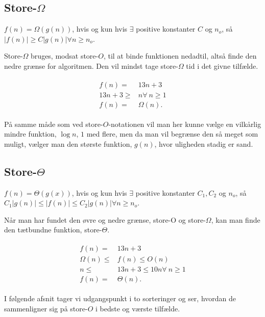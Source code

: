 \subsection{Store-$\Omega$}
\begin{defn}
$f(n) = \Omega(g(n))$, hvis og kun hvis $\exists$ positive konstanter $C$ og $n_o$, så $|f(n)| \geq C |g(n)| \forall n \geq n_o$.
\end{defn}
Store-$\Omega$ bruges, modsat store-$O$, til at binde funktionen nedadtil, altså finde den nedre grænse for algoritmen. Den vil mindst tage store-$\Omega$ tid i det givne tilfælde.
\begin{exmp}
\begin{align}
\begin{split}
f(n)=& 13n+3 \\
13n+3 \geq& n \forall \ n \geq 1 \\
f(n) =& \Omega(n).
\end{split}
\end{align}
\end{exmp}

På samme måde som ved store-$O$-notationen vil man her kunne vælge en vilkårlig mindre funktion, $\log n$, $1$ med flere, men da man vil begrænse den så meget som muligt, vælger man den største funktion, $g(n)$, hvor uligheden stadig er sand.
\subsection{Store-$\Theta$}
\begin{defn}
$f(n) = \Theta(g(x))$, hvis og kun hvis $\exists$ positive konstanter $C_1, C_2$ og $n_o$, så $C_1|g(n)| \leq |f(n)| \leq C_2|g(n)| \forall n \geq n_o$.
\end{defn}
Når man har fundet den øvre og nedre grænse, store-O og store-$\Omega$, kan man finde den tætbundne funktion, store-$\Theta$.
\begin{exmp}
\begin{align}
\begin{split}
f(n)=& 13n+3 \\
\Omega(n) \leq& f(n) \leq O(n) \\
n \leq& 13n+3 \leq 10n \forall \ n \geq 1 \\
f(n) =& \Theta(n).
\end{split}
\end{align}
\end{exmp}

I følgende afsnit tager vi udgangspunkt i to sorteringer og ser, hvordan de sammenligner sig på store-$O$ i bedste og værste tilfælde.

